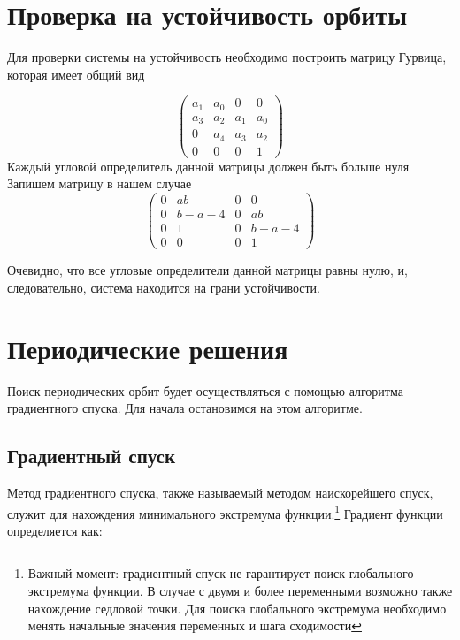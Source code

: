 \documentclass[12pt, a4paper]{article}
\begin{document}
    \section{Проверка на устойчивость орбиты}

    Для проверки системы на устойчивость необходимо построить матрицу Гурвица, которая имеет общий вид

    \begin{equation}
        \label{gurwits}
        \begin{pmatrix}
            a_1 & a_0 & 0   & 0   \\
            a_3 & a_2 & a_1 & a_0 \\
            0   & a_4 & a_3 & a_2 \\
            0   & 0   & 0   & 1
        \end{pmatrix}
    \end{equation}
    Каждый угловой определитель данной матрицы должен быть больше нуля\\
    Запишем матрицу в нашем случае
    \begin{equation*}
        \begin{pmatrix}
            0 & ab        & 0 & 0         \\
            0 & b - a - 4 & 0 & ab        \\
            0 & 1         & 0 & b - a - 4 \\
            0 & 0         & 0 & 1
        \end{pmatrix}
    \end{equation*}

    Очевидно, что все угловые определители данной матрицы равны нулю, и, следовательно, система находится на грани устойчивости.


    \section{Периодические решения}

    Поиск периодических орбит будет осуществляться с помощью алгоритма градиентного спуска.
    Для начала остановимся на этом алгоритме.

    \subsection{Градиентный спуск}

    Метод градиентного спуска, также называемый методом наискорейшего спуск, служит для нахождения минимального экстремума функции.\footnote{Важный момент: градиентный спуск не гарантирует поиск глобального экстремума функции. В случае с двумя и более переменными возможно также нахождение седловой точки. Для поиска глобального экстремума необходимо менять начальные значения переменных и шага сходимости}
    Градиент функции определяется как:
\end{document}
